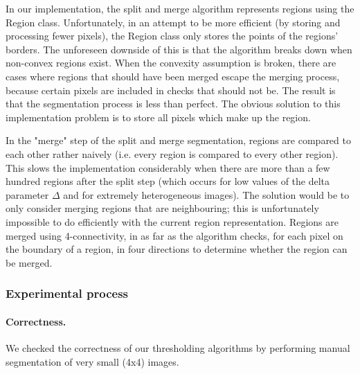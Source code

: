 In our implementation, the split and merge algorithm represents regions using the Region class. Unfortunately, in an attempt to be more efficient (by storing and processing fewer pixels), the Region class only stores the points of the regions' borders. The unforeseen downside of this is that the algorithm breaks down when non-convex regions exist. When the convexity assumption is broken, there are cases where regions that should have been merged escape the merging process, because certain pixels are included in checks that should not be. The result is that the segmentation process is less than perfect. The obvious solution to this implementation problem is to store all pixels which make up the region.

In the "merge" step of the split and merge segmentation, regions are compared to each other rather naively (i.e. every region is compared to every other region). This slows the implementation considerably when there are more than a few hundred regions after the split step (which occurs for low values of the delta parameter $\Delta$ and for extremely heterogeneous images). The solution would be to only consider merging regions that are neighbouring; this is unfortunately impossible to do efficiently with the current region representation. Regions are merged using 4-connectivity, in as far as the algorithm checks, for each pixel on the boundary of a region, in four directions to determine whether the region can be merged.

\subsubsection{Experimental process}

\paragraph{Correctness.}
We checked the correctness of our thresholding algorithms by performing manual segmentation of very small (4x4) images.

